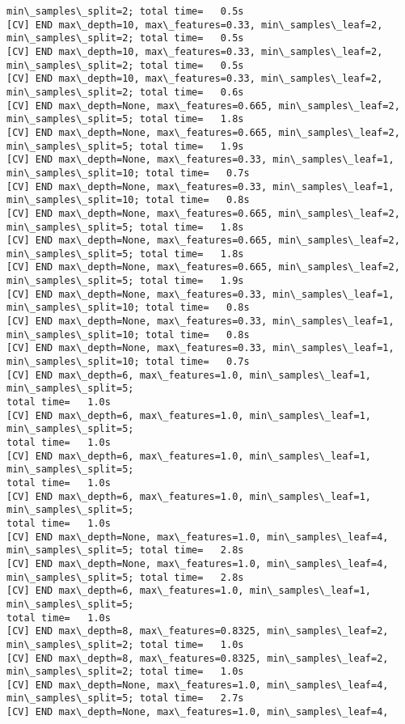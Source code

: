 \documentclass[11pt]{article}
\begin{document}
\begin{Verbatim}[commandchars=\\\{\}]
min\_samples\_split=2; total time=   0.5s
[CV] END max\_depth=10, max\_features=0.33, min\_samples\_leaf=2,
min\_samples\_split=2; total time=   0.5s
[CV] END max\_depth=10, max\_features=0.33, min\_samples\_leaf=2,
min\_samples\_split=2; total time=   0.5s
[CV] END max\_depth=10, max\_features=0.33, min\_samples\_leaf=2,
min\_samples\_split=2; total time=   0.6s
[CV] END max\_depth=None, max\_features=0.665, min\_samples\_leaf=2,
min\_samples\_split=5; total time=   1.8s
[CV] END max\_depth=None, max\_features=0.665, min\_samples\_leaf=2,
min\_samples\_split=5; total time=   1.9s
[CV] END max\_depth=None, max\_features=0.33, min\_samples\_leaf=1,
min\_samples\_split=10; total time=   0.7s
[CV] END max\_depth=None, max\_features=0.33, min\_samples\_leaf=1,
min\_samples\_split=10; total time=   0.8s
[CV] END max\_depth=None, max\_features=0.665, min\_samples\_leaf=2,
min\_samples\_split=5; total time=   1.8s
[CV] END max\_depth=None, max\_features=0.665, min\_samples\_leaf=2,
min\_samples\_split=5; total time=   1.8s
[CV] END max\_depth=None, max\_features=0.665, min\_samples\_leaf=2,
min\_samples\_split=5; total time=   1.9s
[CV] END max\_depth=None, max\_features=0.33, min\_samples\_leaf=1,
min\_samples\_split=10; total time=   0.8s
[CV] END max\_depth=None, max\_features=0.33, min\_samples\_leaf=1,
min\_samples\_split=10; total time=   0.8s
[CV] END max\_depth=None, max\_features=0.33, min\_samples\_leaf=1,
min\_samples\_split=10; total time=   0.7s
[CV] END max\_depth=6, max\_features=1.0, min\_samples\_leaf=1, min\_samples\_split=5;
total time=   1.0s
[CV] END max\_depth=6, max\_features=1.0, min\_samples\_leaf=1, min\_samples\_split=5;
total time=   1.0s
[CV] END max\_depth=6, max\_features=1.0, min\_samples\_leaf=1, min\_samples\_split=5;
total time=   1.0s
[CV] END max\_depth=6, max\_features=1.0, min\_samples\_leaf=1, min\_samples\_split=5;
total time=   1.0s
[CV] END max\_depth=None, max\_features=1.0, min\_samples\_leaf=4,
min\_samples\_split=5; total time=   2.8s
[CV] END max\_depth=None, max\_features=1.0, min\_samples\_leaf=4,
min\_samples\_split=5; total time=   2.8s
[CV] END max\_depth=6, max\_features=1.0, min\_samples\_leaf=1, min\_samples\_split=5;
total time=   1.0s
[CV] END max\_depth=8, max\_features=0.8325, min\_samples\_leaf=2,
min\_samples\_split=2; total time=   1.0s
[CV] END max\_depth=8, max\_features=0.8325, min\_samples\_leaf=2,
min\_samples\_split=2; total time=   1.0s
[CV] END max\_depth=None, max\_features=1.0, min\_samples\_leaf=4,
min\_samples\_split=5; total time=   2.7s
[CV] END max\_depth=None, max\_features=1.0, min\_samples\_leaf=4,

\end{Verbatim}
\end{document}
